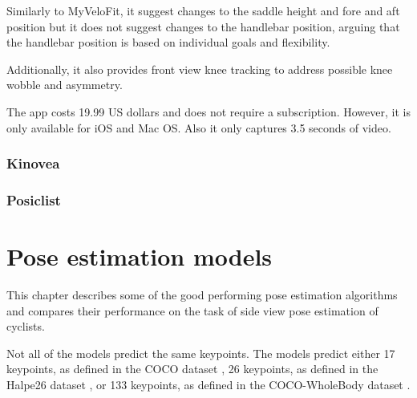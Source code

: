 Similarly to MyVeloFit, it suggest changes to the saddle height and fore and aft position but it does not suggest changes to the handlebar position, arguing that the handlebar position is based on individual goals and flexibility.

Additionally, it also provides front view knee tracking to address possible knee wobble and asymmetry.

The app costs 19.99 US dollars and does not require a subscription. However, it is only available for iOS and Mac OS. Also it only captures 3.5 seconds of video.


\subsection{Kinovea}


\subsection{Posiclist}




\chapter{Pose estimation models}

This chapter describes some of the good performing pose estimation algorithms and compares their performance on the task of side view pose estimation of cyclists.

Not all of the models predict the same keypoints. The models predict either 17 keypoints, as defined in the COCO dataset \cite{coco}, 26 keypoints, as defined in the Halpe26 dataset \cite{halpe}, or 133 keypoints, as defined in the COCO-WholeBody dataset \cite{coco-wholebody}.

